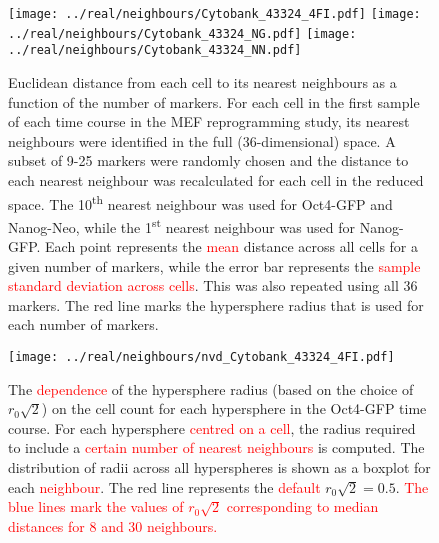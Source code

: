 \documentclass{article}
\newcommand\revised[1]{\textcolor{red}{#1}}
\begin{document}
\begin{figure}[p]
    \begin{center}
        \texttt{[image: ../real/neighbours/Cytobank\_43324\_4FI.pdf]}
        \texttt{[image: ../real/neighbours/Cytobank\_43324\_NG.pdf]}
        \texttt{[image: ../real/neighbours/Cytobank\_43324\_NN.pdf]}          
    \end{center}
    \caption{
        Euclidean distance from each cell to its nearest neighbours as a function of the number of markers.
        For each cell in the first sample of each time course in the MEF reprogramming study, its nearest neighbours were identified in the full (36-dimensional) space.
        A subset of 9-25 markers were randomly chosen and the distance to each nearest neighbour was recalculated for each cell in the reduced space.
        The 10\textsuperscript{th} nearest neighbour was used for Oct4-GFP and Nanog-Neo, while the 1\textsuperscript{st} nearest neighbour was used for Nanog-GFP.
        Each point represents the \revised{mean} distance across all cells for a given number of markers, while the error bar represents the \revised{sample standard deviation across cells}.
        This was also repeated using all 36 markers.
        The red line marks the hypersphere radius that is used for each number of markers.
    }
    \label{fig:radius}
\end{figure}

\begin{figure}[p]
    \begin{center}
        \texttt{[image: ../real/neighbours/nvd\_Cytobank\_43324\_4FI.pdf]}
    \end{center}
    \caption{The \revised{dependence} of the hypersphere radius (based on the choice of $r_0\sqrt{2}$) on the cell count for each hypersphere in the Oct4-GFP time course.
        For each hypersphere \revised{centred on a cell}, the radius required to include a \revised{certain number of nearest neighbours} is computed.
        The distribution of radii across all hyperspheres is shown as a boxplot for each \revised{neighbour}.
        The red line represents the \revised{default} $r_0\sqrt{2}=0.5$.
        \revised{The blue lines mark the values of $r_0\sqrt{2}$ corresponding to median distances for 8 and 30 neighbours.}
    }
    \label{fig:nvd}
\end{figure}
\end{document}
